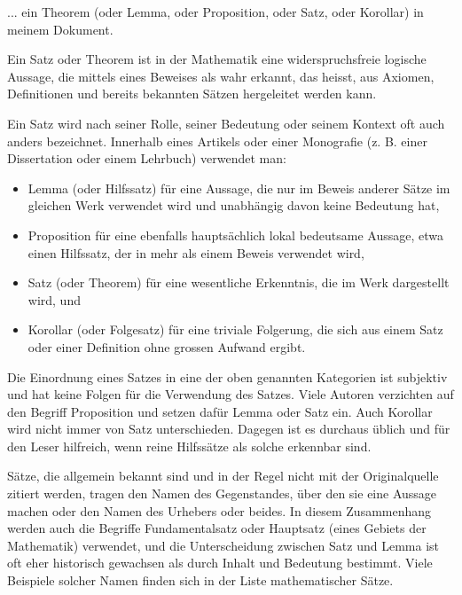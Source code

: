 
... ein Theorem (oder Lemma, oder Proposition, oder Satz, oder Korollar) in meinem Dokument.

Ein Satz oder Theorem ist in der Mathematik eine widerspruchsfreie logische Aussage, die mittels eines Beweises als wahr erkannt, das heisst, aus Axiomen, Definitionen und bereits bekannten Sätzen hergeleitet werden kann.

Ein Satz wird nach seiner Rolle, seiner Bedeutung oder seinem Kontext oft auch anders bezeichnet. Innerhalb eines Artikels oder einer Monografie (z. B. einer Dissertation oder einem Lehrbuch) verwendet man:

\begin{itemize}
\item Lemma (oder Hilfssatz) für eine Aussage, die nur im Beweis anderer Sätze im gleichen Werk verwendet wird und unabhängig davon keine Bedeutung hat,
\item Proposition für eine ebenfalls hauptsächlich lokal bedeutsame Aussage, etwa einen Hilfssatz, der in mehr als einem Beweis verwendet wird,
\item Satz (oder Theorem) für eine wesentliche Erkenntnis, die im Werk dargestellt wird, und
\item Korollar (oder Folgesatz) für eine triviale Folgerung, die sich aus einem Satz oder einer Definition ohne grossen Aufwand ergibt.
\end{itemize}

Die Einordnung eines Satzes in eine der oben genannten Kategorien ist subjektiv und hat keine Folgen für die Verwendung des Satzes. Viele Autoren verzichten auf den Begriff Proposition und setzen dafür Lemma oder Satz ein. Auch Korollar wird nicht immer von Satz unterschieden. Dagegen ist es durchaus üblich und für den Leser hilfreich, wenn reine Hilfssätze als solche erkennbar sind.

Sätze, die allgemein bekannt sind und in der Regel nicht mit der Originalquelle zitiert werden, tragen den Namen des Gegenstandes, über den sie eine Aussage machen oder den Namen des Urhebers oder beides. In diesem Zusammenhang werden auch die Begriffe Fundamentalsatz oder Hauptsatz (eines Gebiets der Mathematik) verwendet, und die Unterscheidung zwischen Satz und Lemma ist oft eher historisch gewachsen als durch Inhalt und Bedeutung bestimmt. Viele Beispiele solcher Namen finden sich in der Liste mathematischer Sätze.
